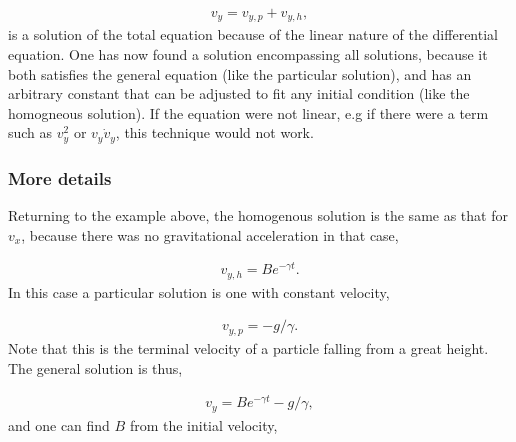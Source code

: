 \documentclass[letterpaper,10pt,english]{sphinxmanual}
\begin{document}
\begin{equation*}
\begin{split}
\begin{equation}
v_y=v_{y,p}+v_{y,h},
\label{_auto9} \tag{9}
\end{equation}
\end{split}
\end{equation*}
is a solution of the total equation because of the linear nature of
the differential equation. One has now found a  solution
encompassing all solutions, because it both satisfies the general
equation (like the particular solution), and has an arbitrary constant
that can be adjusted to fit any initial condition (like the homogneous
solution). If the equation were not linear, e.g if there were a term
such as \(v_y^2\) or \(v_y\dot{v}_y\), this technique would not work.


\subsubsection{More details}
\label{\detokenize{chapter3:more-details}}
Returning to the example above, the homogenous solution is the same as
that for \(v_x\), because there was no gravitational acceleration in
that case,




\begin{equation*}
\begin{split}
\begin{equation}
v_{y,h}=Be^{-\gamma t}.
\label{_auto10} \tag{10}
\end{equation}
\end{split}
\end{equation*}
In this case a particular solution is one with constant velocity,




\begin{equation*}
\begin{split}
\begin{equation}
v_{y,p}=-g/\gamma.
\label{_auto11} \tag{11}
\end{equation}
\end{split}
\end{equation*}
Note that this is the terminal velocity of a particle falling from a
great height. The general solution is thus,




\begin{equation*}
\begin{split}
\begin{equation}
v_y=Be^{-\gamma t}-g/\gamma,
\label{_auto12} \tag{12}
\end{equation}
\end{split}
\end{equation*}
and one can find \(B\) from the initial velocity,
\end{document}
